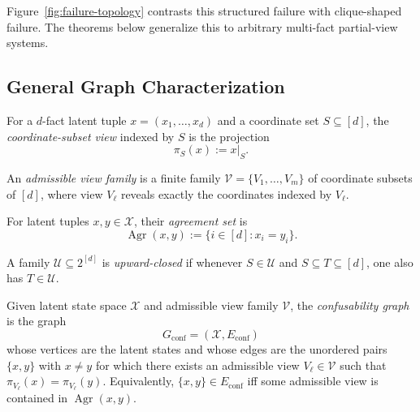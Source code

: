 Figure~\ref{fig:failure-topology} contrasts this structured failure with clique-shaped failure. The theorems below generalize this to arbitrary multi-fact partial-view systems.

\subsection{General Graph Characterization}

\begin{definition}\label{def:coordinate-view}
For a $d$-fact latent tuple $x=(x_1,\dots,x_d)$ and a coordinate set $S\subseteq[d]$, the \emph{coordinate-subset view} indexed by $S$ is the projection
\[
\pi_S(x) := x|_S.
\]
\end{definition}

\begin{definition}\label{def:admissible-view-family}
An \emph{admissible view family} is a finite family $\mathcal V=\{V_1,\dots,V_m\}$ of coordinate subsets of $[d]$, where view $V_\ell$ reveals exactly the coordinates indexed by $V_\ell$.
\end{definition}

\begin{definition}\label{def:agreement-set}
For latent tuples $x,y\in\mathcal X$, their \emph{agreement set} is
\[
\operatorname{Agr}(x,y) := \{i\in[d] : x_i = y_i\}.
\]
\end{definition}

\begin{definition}\label{def:upward-closed-family}
A family $\mathcal U\subseteq 2^{[d]}$ is \emph{upward-closed} if whenever $S\in\mathcal U$ and $S\subseteq T\subseteq[d]$, one also has $T\in\mathcal U$.
\end{definition}

\begin{definition}\label{def:confusability-graph}
Given latent state space $\mathcal X$ and admissible view family $\mathcal V$, the \emph{confusability graph} is the graph
\[
G_{\mathrm{conf}}=(\mathcal X,E_{\mathrm{conf}})
\]
whose vertices are the latent states and whose edges are the unordered pairs $\{x,y\}$ with $x\neq y$ for which there exists an admissible view $V_\ell\in\mathcal V$ such that $\pi_{V_\ell}(x)=\pi_{V_\ell}(y)$. Equivalently, $\{x,y\}\in E_{\mathrm{conf}}$ iff some admissible view is contained in $\operatorname{Agr}(x,y)$.
\end{definition}

